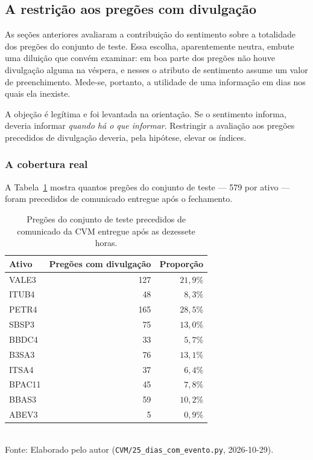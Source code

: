 \subsection{A restrição aos pregões com divulgação}
\label{sec:dias_evento}

As seções anteriores avaliaram a contribuição do sentimento sobre a totalidade dos pregões do
conjunto de teste. Essa escolha, aparentemente neutra, embute uma diluição que convém examinar: em
boa parte dos pregões não houve divulgação alguma na véspera, e nesses o atributo de sentimento
assume um valor de preenchimento. Mede-se, portanto, a utilidade de uma informação em dias nos
quais ela inexiste.

A objeção é legítima e foi levantada na orientação. Se o sentimento informa, deveria informar
\emph{quando há o que informar}. Restringir a avaliação aos pregões precedidos de divulgação
deveria, pela hipótese, elevar os índices.

\subsubsection{A cobertura real}

A Tabela~\ref{tab:cobertura_evento} mostra quantos pregões do conjunto de teste --- 579 por
ativo --- foram precedidos de comunicado entregue após o fechamento.

\begin{table}[htpb]
\centering
\caption{Pregões do conjunto de teste precedidos de comunicado da CVM entregue após as dezessete horas.}
\label{tab:cobertura_evento}
\begin{tabular}{l r r}
\hline
\textbf{Ativo} & \textbf{Pregões com divulgação} & \textbf{Proporção} \\ \hline
VALE3 & 127 & $21{,}9\%$ \\
ITUB4 & 48 & $8{,}3\%$ \\
PETR4 & 165 & $28{,}5\%$ \\
SBSP3 & 75 & $13{,}0\%$ \\
BBDC4 & 33 & $5{,}7\%$ \\
B3SA3 & 76 & $13{,}1\%$ \\
ITSA4 & 37 & $6{,}4\%$ \\
BPAC11 & 45 & $7{,}8\%$ \\
BBAS3 & 59 & $10{,}2\%$ \\
ABEV3 & 5 & $0{,}9\%$ \\
\hline
\end{tabular}
\vspace{0.2cm}
{\small \\ Fonte: Elaborado pelo autor (\texttt{CVM/25\_dias\_com\_evento.py}, 2026-10-29).}
\end{table}

